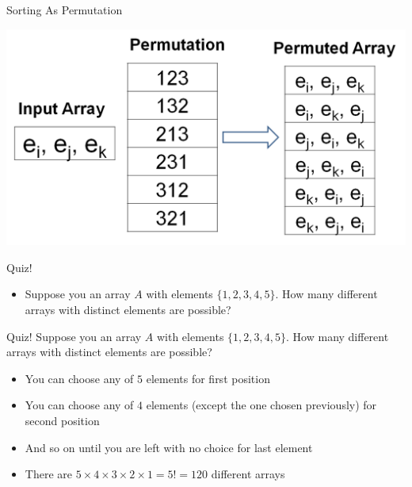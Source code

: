 \documentclass{beamer}
\begin{document}
\begin{frame}{Sorting As Permutation}
\begin{center}
    \includegraphics[scale=0.3]{sortingAsPermutation2.png}
\end{center}
\end{frame}


\begin{frame}{Quiz!}
\begin{itemize}
\item Suppose you an array $A$ with elements $\{1,2,3,4,5\}$. How many different arrays with distinct elements are possible?
\end{itemize}
\end{frame}



\begin{frame}{Quiz!}
Suppose you an array $A$ with elements $\{1,2,3,4,5\}$. How many different arrays with distinct elements are possible?
\begin{itemize}
\item You can choose any of $5$ elements for first position
\item You can choose any of $4$ elements (except the one chosen previously) for second position
\item And so on until you are left with no choice for last element
\item There are $5 \times 4 \times 3 \times 2 \times 1 = 5! = 120$ different arrays
\end{itemize}
\end{frame}
\end{document}
